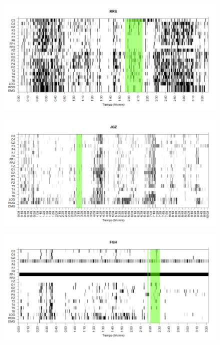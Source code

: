\documentclass[12pt,a4paper]{mitthesis}
\begin{document}

\begin{figure}
\centering
\includegraphics[width=0.9\linewidth]
{./g170413/RRMNS_est.png} 
\label{grf_RRU}
\end{figure}


\begin{figure}
\centering
\includegraphics[width=0.9\linewidth]
{./g170413/JGMN6SUE_est.png} 
\label{grf_JGZ}
\end{figure}


\begin{figure}
\centering
\includegraphics[width=0.9\linewidth]
{./g170413/FGHSUE_est.png} 
\label{grf_FGH}
\end{figure}
\end{document}
